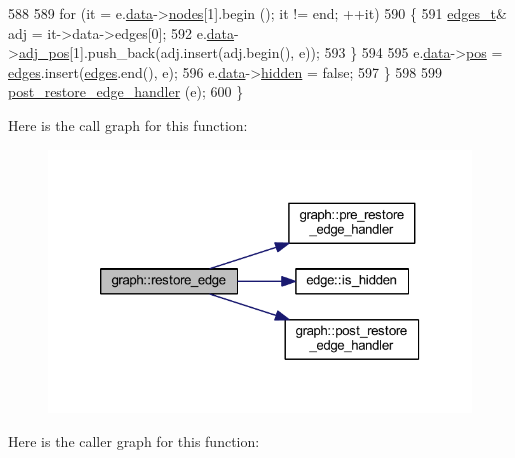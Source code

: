 \begin{DoxyCode}
588     
589     \textcolor{keywordflow}{for} (it = e.\mbox{\hyperlink{classedge_a0ebb6dfa28b77f47529085049352b436}{data}}->\mbox{\hyperlink{classedge__data_a870bbbb05de6c5f63d434db624c55dd4}{nodes}}[1].begin (); it != end; ++it)
590     \{
591         \mbox{\hyperlink{edge_8h_a8f9587479bda6cf612c103494b3858e3}{edges\_t}}& adj = it->data->edges[0];
592         e.\mbox{\hyperlink{classedge_a0ebb6dfa28b77f47529085049352b436}{data}}->\mbox{\hyperlink{classedge__data_aa325caa449576727df8042bad875bf43}{adj\_pos}}[1].push\_back(adj.insert(adj.begin(), e));
593     \}
594     
595     e.\mbox{\hyperlink{classedge_a0ebb6dfa28b77f47529085049352b436}{data}}->\mbox{\hyperlink{classedge__data_a178a8fd40a6ec8139291f96a7807f711}{pos}} = \mbox{\hyperlink{classgraph_ab5b1c610cca1bcf72b05aacc28a48153}{edges}}.insert(\mbox{\hyperlink{classgraph_ab5b1c610cca1bcf72b05aacc28a48153}{edges}}.end(), e);
596     e.\mbox{\hyperlink{classedge_a0ebb6dfa28b77f47529085049352b436}{data}}->\mbox{\hyperlink{classedge__data_af8dc68051e5fe3336aa31ae1f3e104c3}{hidden}} = \textcolor{keyword}{false};
597     \}    
598     
599     \mbox{\hyperlink{classgraph_adfc71011ae82f047c550eba6d9e7bb3a}{post\_restore\_edge\_handler}} (e);
600 \}
\end{DoxyCode}
Here is the call graph for this function\+:
\nopagebreak
\begin{figure}[H]
\begin{center}
\leavevmode
\includegraphics[width=320pt]{classgraph_a2e5426682a0897b9f9104b019970bedc_cgraph}
\end{center}
\end{figure}
Here is the caller graph for this function\+:
\nopagebreak
